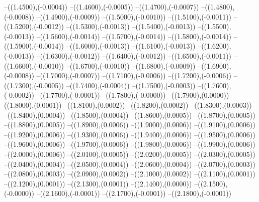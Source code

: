 {	--({\sx*(1.4500)},{\sy*(-0.0004)})
	--({\sx*(1.4600)},{\sy*(-0.0005)})
	--({\sx*(1.4700)},{\sy*(-0.0007)})
	--({\sx*(1.4800)},{\sy*(-0.0008)})
	--({\sx*(1.4900)},{\sy*(-0.0009)})
	--({\sx*(1.5000)},{\sy*(-0.0010)})
	--({\sx*(1.5100)},{\sy*(-0.0011)})
	--({\sx*(1.5200)},{\sy*(-0.0012)})
	--({\sx*(1.5300)},{\sy*(-0.0013)})
	--({\sx*(1.5400)},{\sy*(-0.0013)})
	--({\sx*(1.5500)},{\sy*(-0.0013)})
	--({\sx*(1.5600)},{\sy*(-0.0014)})
	--({\sx*(1.5700)},{\sy*(-0.0014)})
	--({\sx*(1.5800)},{\sy*(-0.0014)})
	--({\sx*(1.5900)},{\sy*(-0.0014)})
	--({\sx*(1.6000)},{\sy*(-0.0013)})
	--({\sx*(1.6100)},{\sy*(-0.0013)})
	--({\sx*(1.6200)},{\sy*(-0.0013)})
	--({\sx*(1.6300)},{\sy*(-0.0012)})
	--({\sx*(1.6400)},{\sy*(-0.0012)})
	--({\sx*(1.6500)},{\sy*(-0.0011)})
	--({\sx*(1.6600)},{\sy*(-0.0010)})
	--({\sx*(1.6700)},{\sy*(-0.0010)})
	--({\sx*(1.6800)},{\sy*(-0.0009)})
	--({\sx*(1.6900)},{\sy*(-0.0008)})
	--({\sx*(1.7000)},{\sy*(-0.0007)})
	--({\sx*(1.7100)},{\sy*(-0.0006)})
	--({\sx*(1.7200)},{\sy*(-0.0006)})
	--({\sx*(1.7300)},{\sy*(-0.0005)})
	--({\sx*(1.7400)},{\sy*(-0.0004)})
	--({\sx*(1.7500)},{\sy*(-0.0003)})
	--({\sx*(1.7600)},{\sy*(-0.0002)})
	--({\sx*(1.7700)},{\sy*(-0.0001)})
	--({\sx*(1.7800)},{\sy*(-0.0000)})
	--({\sx*(1.7900)},{\sy*(0.0000)})
	--({\sx*(1.8000)},{\sy*(0.0001)})
	--({\sx*(1.8100)},{\sy*(0.0002)})
	--({\sx*(1.8200)},{\sy*(0.0002)})
	--({\sx*(1.8300)},{\sy*(0.0003)})
	--({\sx*(1.8400)},{\sy*(0.0004)})
	--({\sx*(1.8500)},{\sy*(0.0004)})
	--({\sx*(1.8600)},{\sy*(0.0005)})
	--({\sx*(1.8700)},{\sy*(0.0005)})
	--({\sx*(1.8800)},{\sy*(0.0005)})
	--({\sx*(1.8900)},{\sy*(0.0006)})
	--({\sx*(1.9000)},{\sy*(0.0006)})
	--({\sx*(1.9100)},{\sy*(0.0006)})
	--({\sx*(1.9200)},{\sy*(0.0006)})
	--({\sx*(1.9300)},{\sy*(0.0006)})
	--({\sx*(1.9400)},{\sy*(0.0006)})
	--({\sx*(1.9500)},{\sy*(0.0006)})
	--({\sx*(1.9600)},{\sy*(0.0006)})
	--({\sx*(1.9700)},{\sy*(0.0006)})
	--({\sx*(1.9800)},{\sy*(0.0006)})
	--({\sx*(1.9900)},{\sy*(0.0006)})
	--({\sx*(2.0000)},{\sy*(0.0006)})
	--({\sx*(2.0100)},{\sy*(0.0005)})
	--({\sx*(2.0200)},{\sy*(0.0005)})
	--({\sx*(2.0300)},{\sy*(0.0005)})
	--({\sx*(2.0400)},{\sy*(0.0004)})
	--({\sx*(2.0500)},{\sy*(0.0004)})
	--({\sx*(2.0600)},{\sy*(0.0004)})
	--({\sx*(2.0700)},{\sy*(0.0003)})
	--({\sx*(2.0800)},{\sy*(0.0003)})
	--({\sx*(2.0900)},{\sy*(0.0002)})
	--({\sx*(2.1000)},{\sy*(0.0002)})
	--({\sx*(2.1100)},{\sy*(0.0001)})
	--({\sx*(2.1200)},{\sy*(0.0001)})
	--({\sx*(2.1300)},{\sy*(0.0001)})
	--({\sx*(2.1400)},{\sy*(0.0000)})
	--({\sx*(2.1500)},{\sy*(-0.0000)})
	--({\sx*(2.1600)},{\sy*(-0.0001)})
	--({\sx*(2.1700)},{\sy*(-0.0001)})
	--({\sx*(2.1800)},{\sy*(-0.0001)})
}

